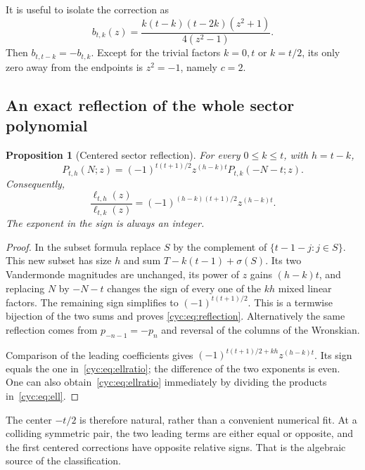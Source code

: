 \documentclass[11pt,a4paper]{article}
\numberwithin{equation}{section}
\newtheorem{proposition}[theorem]{Proposition}
\theoremstyle{definition}
\theoremstyle{remark}
\begin{document}
It is useful to isolate the correction as
\begin{equation}\label{cyc:eq:b}
 b_{t,k}(z)=\frac{k(t-k)(t-2k)(z^2+1)}{4(z^2-1)}.
\end{equation}
Then $b_{t,t-k}=-b_{t,k}$.  Except for the trivial factors
$k=0,t$ or $k=t/2$, its only zero away from the endpoints is
$z^2=-1$, namely $c=2$.

\subsection{An exact reflection of the whole sector polynomial}
\begin{proposition}[Centered sector reflection]\label{cyc:prop:reflection}
For every $0\le k\le t$, with $h=t-k$,
\begin{equation}\label{cyc:eq:reflection}
 P_{t,h}(N;z)=(-1)^{t(t+1)/2}z^{(h-k)t}P_{t,k}(-N-t;z).
\end{equation}
Consequently,
\begin{equation}\label{cyc:eq:ellratio}
 \frac{\ell_{t,h}(z)}{\ell_{t,k}(z)}
 =(-1)^{(h-k)(t+1)/2}z^{(h-k)t}.
\end{equation}
The exponent in the sign is always an integer.
\end{proposition}
\begin{proof}
In the subset formula replace $S$ by the complement of
$\{t-1-j:j\in S\}$.  This new subset has size $h$ and sum
$T-k(t-1)+\sigma(S)$.  Its two Vandermonde magnitudes are unchanged,
its power of $z$ gains $(h-k)t$, and replacing $N$ by $-N-t$
changes the sign of every one of the $kh$ mixed linear factors.
The remaining sign simplifies to $(-1)^{t(t+1)/2}$.
This is a termwise bijection of the two sums and proves
\eqref{cyc:eq:reflection}.  Alternatively the same reflection comes from
$p_{-n-1}=-p_n$ and reversal of the columns of the Wronskian.

Comparison of the leading coefficients gives
$(-1)^{t(t+1)/2+kh}z^{(h-k)t}$.  Its sign equals the one
in~\eqref{cyc:eq:ellratio}; the difference of the two exponents is even.
One can also obtain~\eqref{cyc:eq:ellratio} immediately by dividing the
products in~\eqref{cyc:eq:ell}.
\end{proof}

The center $-t/2$ is therefore natural, rather than a convenient
numerical fit.  At a colliding symmetric pair, the two leading terms
are either equal or opposite, and the first centered corrections have
opposite relative signs.  That is the algebraic source of the
classification.
\end{document}
